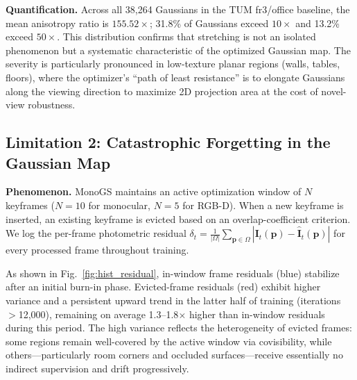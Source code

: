 \documentclass[conference]{IEEEtran}
\begin{document}
\textbf{Quantification.}
Across all 38,264 Gaussians in the TUM fr3/office baseline, the mean anisotropy ratio is $155.52\times$; 31.8\% of Gaussians exceed $10\times$ and 13.2\% exceed $50\times$.
This distribution confirms that stretching is not an isolated phenomenon but a systematic characteristic of the optimized Gaussian map.
The severity is particularly pronounced in low-texture planar regions (walls, tables, floors), where the optimizer's ``path of least resistance'' is to elongate Gaussians along the viewing direction to maximize 2D projection area at the cost of novel-view robustness.

\subsection{Limitation 2: Catastrophic Forgetting in the Gaussian Map}
\label{sec:lim2}

\textbf{Phenomenon.}
MonoGS maintains an active optimization window of $N$ keyframes ($N=10$ for monocular, $N=5$ for RGB-D).
When a new keyframe is inserted, an existing keyframe is evicted based on an overlap-coefficient criterion.
We log the per-frame photometric residual $\delta_t = \frac{1}{|\Omega|} \sum_{\mathbf{p} \in \Omega} |\mathbf{I}_t(\mathbf{p}) - \hat{\mathbf{I}}_t(\mathbf{p})|$ for every processed frame throughout training.

As shown in Fig.~\ref{fig:hist_residual}, in-window frame residuals (blue) stabilize after an initial burn-in phase. Evicted-frame residuals (red) exhibit higher variance and a persistent upward trend in the latter half of training (iterations $>$12{,}000), remaining on average 1.3--1.8$\times$ higher than in-window residuals during this period. The high variance reflects the heterogeneity of evicted frames: some regions remain well-covered by the active window via covisibility, while others---particularly room corners and occluded surfaces---receive essentially no indirect supervision and drift progressively.
\end{document}
